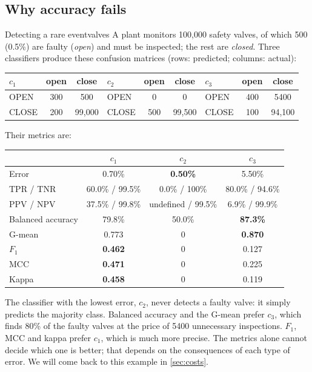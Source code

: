 \subsection{Why accuracy fails}

\begin{example}{Detecting a rare event}{valves}
A plant monitors 100,000 safety valves, of which 500 (0.5\%) are faulty (\emph{open}) and must
be inspected; the rest are \emph{closed}. Three classifiers produce these confusion matrices
(rows: predicted; columns: actual):
\begin{center}\small
\begin{tabular}{@{}lcc@{\qquad}lcc@{\qquad}lcc@{}}
\toprule
$c_1$ & open & close & $c_2$ & open & close & $c_3$ & open & close\\
\midrule
OPEN  & 300 & 500    & OPEN  & 0   & 0      & OPEN  & 400 & 5400\\
CLOSE & 200 & 99,000 & CLOSE & 500 & 99,500 & CLOSE & 100 & 94,100\\
\bottomrule
\end{tabular}
\end{center}
Their metrics are:
\begin{center}\small
\begin{tabular}{@{}lccc@{}}
\toprule
& $c_1$ & $c_2$ & $c_3$\\
\midrule
Error & 0.70\% & \textbf{0.50\%} & 5.50\%\\
TPR\index{true positive rate} / TNR & 60.0\% / 99.5\% & 0.0\% / 100\% & 80.0\% / 94.6\%\\
PPV\index{predictive value!positive} / NPV\index{predictive value!negative} & 37.5\% / 99.8\% & undefined / 99.5\% & 6.9\% / 99.9\%\\
Balanced accuracy\index{balanced accuracy} & 79.8\% & 50.0\% & \textbf{87.3\%}\\
G-mean & 0.773 & 0 & \textbf{0.870}\\
$F_1$ & \textbf{0.462} & 0 & 0.127\\
MCC\index{Matthews correlation coefficient} & \textbf{0.471} & 0 & 0.225\\
Kappa & \textbf{0.458} & 0 & 0.119\\
\bottomrule
\end{tabular}
\end{center}
The classifier with the lowest error, $c_2$, never detects a faulty valve: it simply predicts
the majority class. Balanced accuracy and the G-mean prefer $c_3$, which finds 80\% of the
faulty valves at the price of 5400 unnecessary inspections. $F_1$, MCC and kappa prefer $c_1$,
which is much more precise. The metrics alone cannot decide which one is better; that depends on the
consequences of each type of error. We will come back to this example in
\cref{sec:costs}.
\end{example}

